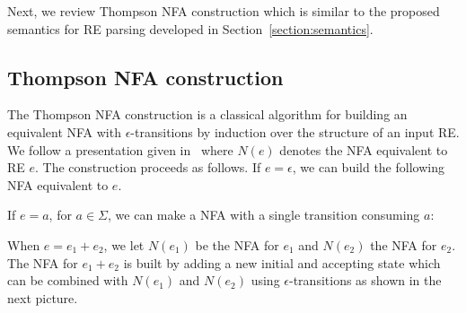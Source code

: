 \documentclass[sigplan]{acmart}
\theoremstyle{definition}
\begin{document}
Next, we review Thompson NFA construction which is similar to the proposed semantics
for RE parsing developed in Section~\ref{section:semantics}.

\subsection{Thompson NFA construction}
\label{subsection:thompsonnfraconstruction}

The Thompson NFA construction is a classical algorithm for building an equivalent
NFA with $\epsilon$-transitions by induction over the structure of an input RE.
We follow a presentation given in~\cite{Aho1986} where $N(e)$ denotes the NFA
equivalent to RE $e$. The construction proceeds as follows. If $e = \epsilon$,
we can build the following NFA equivalent to $e$.
\begin{center}
\end{center}
If $e = a$, for $a \in \Sigma$, we can make a NFA with a single transition consuming
$a$:
\begin{center}
\end{center}
When $e = e_1 + e_2$, we let $N(e_1)$ be the NFA for $e_1$ and $N(e_2)$ the
NFA for $e_2$. The NFA for $e_1 + e_2$ is built by adding a new initial and accepting
state which can be combined with $N(e_1)$ and $N(e_2)$ using $\epsilon$-transitions as
shown in the next picture.
\end{document}
